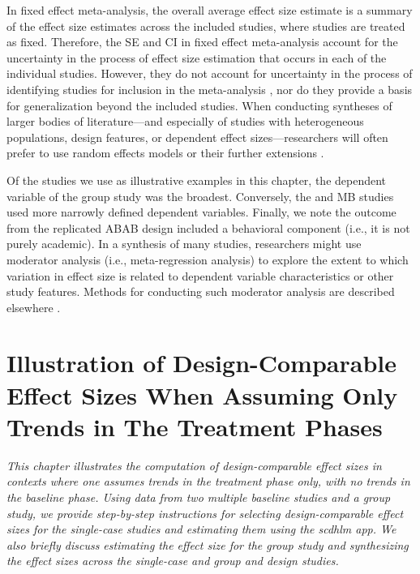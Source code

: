 \documentclass[
]{book}
\begin{document}
In fixed effect meta-analysis, the overall average effect size estimate is a summary of the effect size estimates across the included studies, where studies are treated as fixed. Therefore, the SE and CI in fixed effect meta-analysis account for the uncertainty in the process of effect size estimation that occurs in each of the individual studies. However, they do not account for uncertainty in the process of identifying studies for inclusion in the meta-analysis \citep{konstantopoulos2019statistically, Rice_Higgins_Lumley_2018}, nor do they provide a basis for generalization beyond the included studies. When conducting syntheses of larger bodies of literature---and especially of studies with heterogeneous populations, design features, or dependent effect sizes---researchers will often prefer to use random effects models \citep{Hedges_Vevea_1998} or their further extensions \citep{PustejovskyTipton2021, van2013three}.

Of the studies we use as illustrative examples in this chapter, the dependent variable of the group study \citep{hutchinson1993Effects} was the broadest. Conversely, the \citet{case1992Improving} and \citet{peltier2020Effects} MB studies used more narrowly defined dependent variables. Finally, we note the outcome from the replicated ABAB design \citep{lambert2006effects} included a behavioral component (i.e., it is not purely academic). In a synthesis of many studies, researchers might use moderator analysis (i.e., meta-regression analysis) to explore the extent to which variation in effect size is related to dependent variable characteristics or other study features. Methods for conducting such moderator analysis are described elsewhere \citetext{\citealp[Chapters 19-21]{borenstein2021introduction}; \citealp{konstantopoulos2019statistically}}.

\hypertarget{illustrate-D-CES-Ttrends}{%
\chapter{Illustration of Design-Comparable Effect Sizes When Assuming Only Trends in The Treatment Phases}\label{illustrate-D-CES-Ttrends}}


\emph{This chapter illustrates the computation of design-comparable effect sizes in contexts where one assumes trends in the treatment phase only, with no trends in the baseline phase. Using data from two multiple baseline studies and a group study, we provide step-by-step instructions for selecting design-comparable effect sizes for the single-case studies and estimating them using the \emph{scdhlm} app. We also briefly discuss estimating the effect size for the group study and synthesizing the effect sizes across the single-case and group and design studies.}
\end{document}
